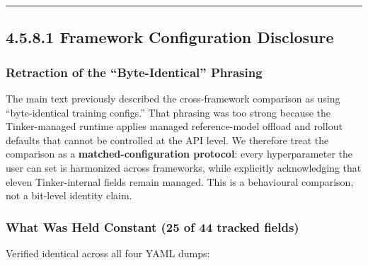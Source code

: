 \documentclass[
  american,
  11pt,
  a4paper,
  oneside]{report}
\begin{document}
\begin{center}\rule{0.5\linewidth}{0.5pt}\end{center}

\subsection{4.5.8.1 Framework Configuration
Disclosure}\label{framework-configuration-disclosure}

\subsubsection{Retraction of the ``Byte-Identical''
Phrasing}\label{retraction-of-the-byte-identical-phrasing}

The main text previously described the cross-framework comparison as
using ``byte-identical training configs.'' That phrasing was too strong
because the Tinker-managed runtime applies managed reference-model
offload and rollout defaults that cannot be controlled at the API level.
We therefore treat the comparison as a \textbf{matched-configuration
protocol}: every hyperparameter the user can set is harmonized across
frameworks, while explicitly acknowledging that eleven Tinker-internal
fields remain managed. This is a behavioural comparison, not a bit-level
identity claim.

\subsubsection{What Was Held Constant (25 of 44 tracked
fields)}\label{what-was-held-constant-31-of-47-tracked-fields}

Verified identical across all four YAML dumps:
\end{document}
